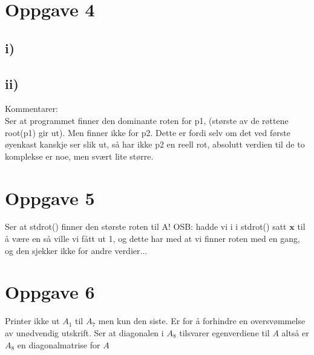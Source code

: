 \documentclass[a4paper, norsk, twoside, 10pt]{article}
\begin{document}
\begin{flushleft}
\newpage
  \section*{Oppgave 4}
  \subsection*{i)}

  
\newpage
  \subsection*{ii)}

  
\newpage

  Kommentarer: \\
  Ser at programmet finner den dominante roten for p1, (største av de røttene root(p1) gir ut). Men finner ikke for p2. Dette er fordi selv om det ved første øyenkast kanskje ser slik ut, så har ikke p2 en reell rot, absolutt verdien til de to komplekse er noe, men svært lite større.


  \section*{Oppgave 5}
  


  Ser at stdrot() finner den største roten til A! OSB: hadde vi i i stdrot() satt $\mathbf{x}$ til å være en så ville vi fått ut 1, og dette har med at vi finner roten med en gang, og den sjekker ikke for andre verdier...

\newpage
  \section*{Oppgave 6}
  
  Printer ikke ut $A_{1}$ til $A_{7}$ men kun den siste. Er for å forhindre en oversvømmelse av unødvendig utskrift.
  Ser at diagonalen i $A_{8}$ tilsvarer egenverdiene til $A$ altså er $A_{8}$ en diagonalmatrise for $A$
\end{flushleft}
\end{document}

